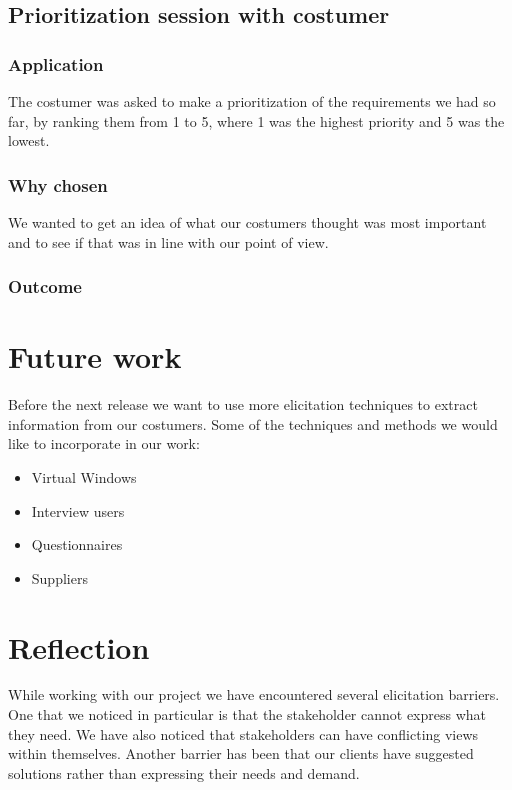 \documentclass[a4paper]{article}
\begin{document}
  \subsection{Prioritization session with costumer}
    \subsubsection{Application}
      The costumer was asked to make a prioritization of the requirements we had so far, by ranking them from 1 to 5, where 1 was the highest priority and 5 was the lowest.
    \subsubsection{Why chosen}
      We wanted to get an idea of what our costumers thought was most important and to see if that was in line with our point of view.
    \subsubsection{Outcome}

  

  \section{Future work}
Before the next release we want to use more elicitation techniques to extract
information from our costumers. Some of the techniques and methods we would
like to incorporate in our work:

  \begin{itemize}
  	\item Virtual Windows
  	\item Interview users
  	\item Questionnaires
  	\item Suppliers 
  \end{itemize}
 
  \section{Reflection}

While working with our project we have encountered several elicitation barriers. One that we noticed in particular is that the stakeholder cannot express what they need. We have also noticed that stakeholders can have conflicting views within themselves. Another barrier has been that our clients have suggested solutions rather than expressing their needs and demand.
\end{document}
